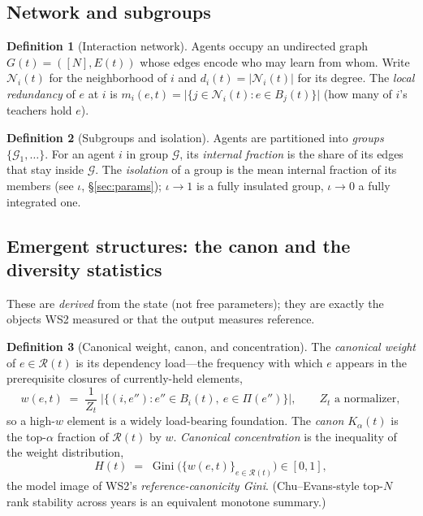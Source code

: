 \documentclass[11pt,letterpaper]{article}
\theoremstyle{definition}
\newtheorem{definition}{Definition}[section]
\theoremstyle{plain}
\newcommand{\N}{\mathcal{N}}
\newcommand{\R}{\mathcal{R}}
\newcommand{\clo}{\Pi}
\newcommand{\card}[1]{\lvert #1 \rvert}
\DeclareMathOperator{\Gini}{Gini}
\begin{document}
\subsection{Network and subgroups}

\begin{definition}[Interaction network]
Agents occupy an undirected graph $G(t)=([N],E(t))$ whose edges encode who may
learn from whom. Write $\N_i(t)$ for the neighborhood of $i$ and
$d_i(t)=\card{\N_i(t)}$ for its degree. The \emph{local redundancy} of $e$ at $i$
is $m_i(e,t) = \card{\{j\in\N_i(t) : e\in B_j(t)\}}$ (how many of $i$'s teachers
hold $e$).
\end{definition}

\begin{definition}[Subgroups and isolation]
Agents are partitioned into \emph{groups} $\{\mathcal{G}_1,\dots\}$. For an agent
$i$ in group $\mathcal{G}$, its \emph{internal fraction} is the share of its edges
that stay inside $\mathcal{G}$. The \emph{isolation} of a group is the mean
internal fraction of its members (see $\iota$, \S\ref{sec:params}); $\iota\to 1$
is a fully insulated group, $\iota\to 0$ a fully integrated one.
\end{definition}

\subsection{Emergent structures: the canon and the diversity statistics}

These are \emph{derived} from the state (not free parameters); they are exactly
the objects WS2 measured or that the output measures reference.

\begin{definition}[Canonical weight, canon, and concentration]\label{def:canon}
The \emph{canonical weight} of $e\in\R(t)$ is its dependency load---the frequency
with which $e$ appears in the prerequisite closures of currently-held elements,
\begin{equation}
  w(e,t) \;=\; \frac{1}{Z_t}\;\card{\big\{(i,e'') : e''\in B_i(t),\ e\in\clo(e'')\big\}},
  \qquad Z_t \text{ a normalizer},
\end{equation}
so a high-$w$ element is a widely load-bearing foundation. The \emph{canon}
$K_\alpha(t)$ is the top-$\alpha$ fraction of $\R(t)$ by $w$. \emph{Canonical
concentration} is the inequality of the weight distribution,
\begin{equation}
  H(t) \;=\; \Gini\big(\{w(e,t)\}_{e\in\R(t)}\big) \in [0,1],
\end{equation}
the model image of WS2's \emph{reference-canonicity Gini}. (Chu--Evans-style
top-$N$ rank stability across years is an equivalent monotone summary.)
\end{definition}
\end{document}
